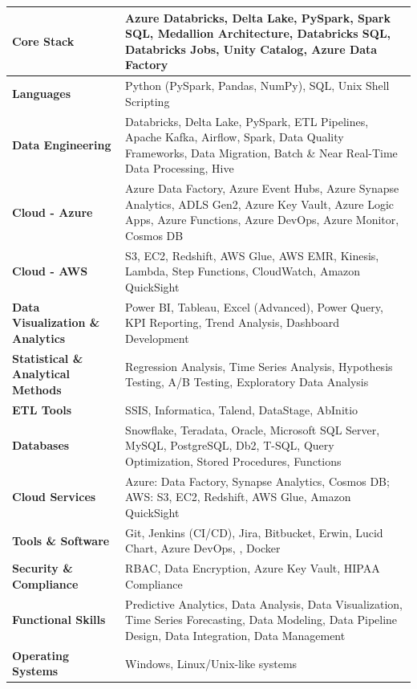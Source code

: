 \documentclass[a4paper,10pt]{article}
\begin{document}
\begin{longtable}{|p{}|p{}|}
\hline
\textbf{Core Stack} & Azure Databricks, Delta Lake, PySpark, Spark SQL, Medallion Architecture, Databricks SQL, Databricks Jobs, Unity Catalog, Azure Data Factory \\
\hline
\textbf{Languages} & Python (PySpark, Pandas, NumPy), SQL, Unix Shell Scripting \\
\hline
\textbf{Data Engineering} & Databricks, Delta Lake, PySpark, ETL Pipelines, Apache Kafka, Airflow, Spark, Data Quality Frameworks, Data Migration, Batch \& Near Real-Time Data Processing, Hive \\
\hline
\textbf{Cloud - Azure} & Azure Data Factory, Azure Event Hubs, Azure Synapse Analytics, ADLS Gen2, Azure Key Vault, Azure Logic Apps, Azure Functions, Azure DevOps, Azure Monitor, Cosmos DB \\
\hline
\textbf{Cloud - AWS} & S3, EC2, Redshift, AWS Glue, AWS EMR, Kinesis, Lambda, Step Functions, CloudWatch, Amazon QuickSight \\
\hline
\textbf{Data Visualization \& Analytics} & Power BI, Tableau, Excel (Advanced), Power Query, KPI Reporting, Trend Analysis, Dashboard Development \\
\hline
\textbf{Statistical \& Analytical Methods} & Regression Analysis, Time Series Analysis, Hypothesis Testing, A/B Testing, Exploratory Data Analysis \\
\hline
\textbf{ETL Tools} & SSIS, Informatica, Talend, DataStage, AbInitio \\
\hline
\textbf{Databases} & Snowflake, Teradata, Oracle, Microsoft SQL Server, MySQL, PostgreSQL, Db2, T-SQL, Query Optimization, Stored Procedures, Functions \\
\hline
\textbf{Cloud Services} & Azure: Data Factory, Synapse Analytics, Cosmos DB; AWS: S3, EC2, Redshift, AWS Glue, Amazon QuickSight \\
\hline
\textbf{Tools \& Software} & Git, Jenkins (CI/CD), Jira, Bitbucket, Erwin, Lucid Chart, Azure DevOps, , Docker \\
\hline
\textbf{Security \& Compliance} & RBAC, Data Encryption, Azure Key Vault, HIPAA Compliance \\
\hline
\textbf{Functional Skills} & Predictive Analytics, Data Analysis, Data Visualization, Time Series Forecasting, Data Modeling, Data Pipeline Design, Data Integration, Data Management \\
\hline
\textbf{Operating Systems} & Windows, Linux/Unix-like systems \\
\hline
\end{longtable}
\end{document}
